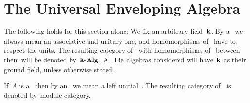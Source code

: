 \chapter{The Universal Enveloping Algebra}


\begin{convention}
  The following holds for this section alone:
  We fix an arbitrary field~$\kf$.
  By a~{\algebra{$\kf$}} we always mean an associative and unitary one, and homomorphisms of~{\algebras{$\kf$}} have to respect the units.
  The resulting category of~{\algebras{$\kf$}} with homomorphisms of~{\algebra{$\kf$}} between them will be denoted by~$\mathbf{k}\text{-}\mathbf{Alg}$.
  All Lie~algebras considered will have~$\kf$ as their ground field, unless otherwise stated.
  
  If~$A$ is a~{\algebra{$\kf$}} then by an~ we mean a left unitial~{}.
  The resulting category of~{} is denoted by~\gls*{module category}.
\end{convention}










